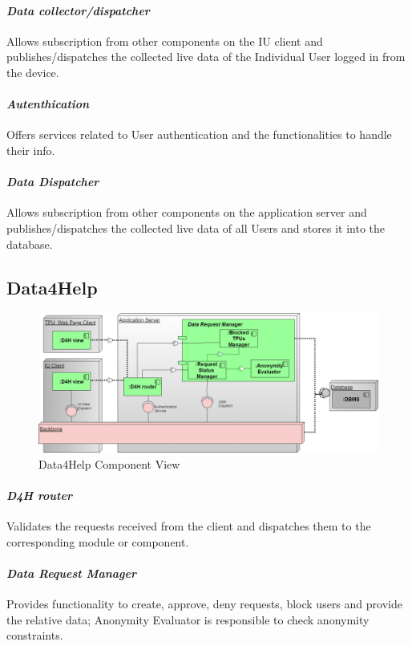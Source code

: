 \paragraph{\textit{Data collector/dispatcher}} Allows subscription from other components on the IU client and publishes/dispatches the collected live data of the Individual User logged in from the device. 
\paragraph{\textit{Autenthication}} Offers services related to User authentication and the functionalities to handle their info.
\paragraph{\textit{Data Dispatcher}} Allows subscription from other components on the application server and publishes/dispatches the collected live data of all Users and stores it into the database.
\subsection{Data4Help}
\label{subsect:D4HComponentView}
\begin{figure}[H]
\caption{Data4Help Component View}
\includegraphics[width = \textwidth]{sections/architecturalDesign/D4HDiagram.png}
\end{figure}
\paragraph{\textit{D4H router}} Validates the requests received from the client and dispatches them to the corresponding module or component.
\paragraph{\textit{Data Request Manager}} Provides functionality to create, approve, deny requests, block users and provide the relative data; Anonymity Evaluator is responsible to check anonymity constraints. 
